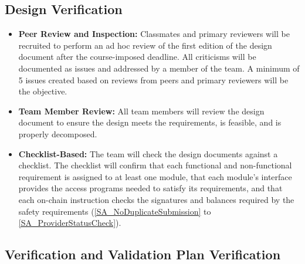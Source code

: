 \documentclass[12pt]{article}
\newcommand{\saref}[1]{\ref{#1}}
\begin{document}
\subsection{Design Verification}




\begin{itemize}
  \item \textbf{Peer Review and Inspection: }
  Classmates and primary reviewers will be 
  recruited to perform an ad hoc review of the first edition of the design document after the course-imposed deadline. 
  All criticisms will be documented as issues and addressed by a member of the team. A minimum of 5 issues created based on reviews 
  from peers and primary reviewers will be the objective.
  \item \textbf{Team Member Review: } 
  All team members will review the design document to ensure the design meets the requirements, is feasible, and is properly decomposed.
  \item \textbf{Checklist-Based: } 
  The team will check the design documents against a checklist. The checklist will confirm that each
  functional and non-functional requirement is assigned to at least one module, that each module's interface
  provides the access programs needed to satisfy its requirements, and that each on-chain instruction checks
  the signatures and balances required by the safety requirements (\saref{SA_NoDuplicateSubmission} to \saref{SA_ProviderStatusCheck}).
\end{itemize}

\subsection{Verification and Validation Plan Verification}



\end{document}
